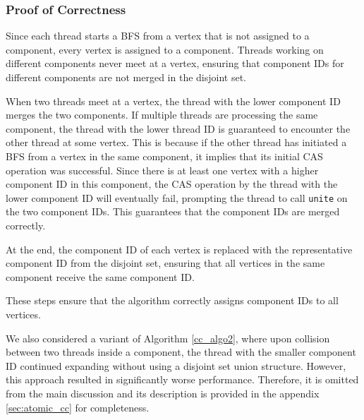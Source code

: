 \subsubsection{Proof of Correctness}

Since each thread starts a BFS from a vertex that is not assigned to a component, every vertex is assigned to a component. Threads working on different components never meet at a vertex, ensuring that component IDs for different components are not merged in the disjoint set.

When two threads meet at a vertex, the thread with the lower component ID merges the two components. If multiple threads are processing the same component, the thread with the lower thread ID is guaranteed to encounter the other thread at some vertex. This is because if the other thread has initiated a BFS from a vertex in the same component, it implies that its initial CAS operation was successful. Since there is at least one vertex with a higher component ID in this component, the CAS operation by the thread with the lower component ID will eventually fail, prompting the thread to call \texttt{unite} on the two component IDs. This guarantees that the component IDs are merged correctly.

At the end, the component ID of each vertex is replaced with the representative component ID from the disjoint set, ensuring that all vertices in the same component receive the same component ID.

These steps ensure that the algorithm correctly assigns component IDs to all vertices.

\begin{remark*}
    We also considered a variant of Algorithm \ref{cc_algo2}, where upon collision between two threads inside a component, the thread with the smaller component ID continued expanding without using a disjoint set union structure. However, this approach resulted in significantly worse performance. Therefore, it is omitted from the main discussion and its description is provided in the appendix \ref{sec:atomic_cc} for completeness.
\end{remark*}